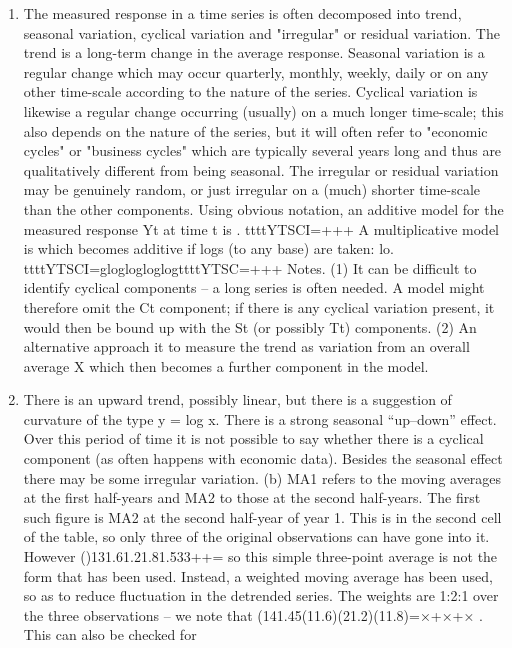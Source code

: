 \documentclass[a4paper,12pt]{article}
\begin{document}
\begin{enumerate}
    \item The measured response in a time series is often decomposed into trend, seasonal variation, cyclical variation and "irregular" or residual variation. The trend is a long-term change in the average response. Seasonal variation is a regular change which may occur quarterly, monthly, weekly, daily or on any other time-scale according to the nature of the series. Cyclical variation is likewise a regular change occurring (usually) on a much longer time-scale; this also depends on the nature of the series, but it will often refer to "economic cycles" or "business cycles" which are typically several years long and thus are qualitatively different from being seasonal. The irregular or residual variation may be genuinely random, or just irregular on a (much) shorter time-scale than the other components.
Using obvious notation, an additive model for the measured response Yt at time t is
. ttttYTSCI=+++
A multiplicative model is which becomes additive if logs (to any base) are taken: lo. ttttYTSCI=gloglogloglogttttYTSC=+++
Notes.
(1) It can be difficult to identify cyclical components – a long series is often needed. A model might therefore omit the Ct component; if there is any cyclical variation present, it would then be bound up with the St (or possibly Tt) components.
(2) An alternative approach it to measure the trend as variation from an overall average X which then becomes a further component in the model.
\item There is an upward trend, possibly linear, but there is a suggestion of curvature of the type y = log x. There is a strong seasonal “up–down” effect. Over this period of time it is not possible to say whether there is a cyclical component (as often happens with economic data). Besides the seasonal effect there may be some irregular variation.
(b) MA1 refers to the moving averages at the first half-years and MA2 to those at the second half-years. The first such figure is MA2 at the second half-year of year 1. This is in the second cell of the table, so only three of the original observations can have gone into it. However ()131.61.21.81.533++= so this simple three-point average is not the form that has been used. Instead, a weighted moving average has been used, so as to reduce fluctuation in the detrended series. The weights are 1:2:1 over the three observations – we note that (141.45(11.6)(21.2)(11.8)=×+×+× . This can also be checked for

\end{enumerate}
\end{document}
